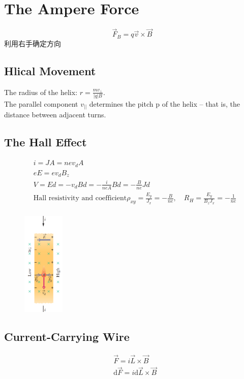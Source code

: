 \documentclass[11pt, a4paper]{article}
\begin{document}
\section{The Ampere Force}
$$\vec{F}_B = q\vec{v}\times \vec{B}$$
利用右手确定方向

\subsection{Hlical Movement}
The radius of the helix: $r=\frac{mv_\perp}{|q|B}$.\\
The parallel component $v_{||}$ determines the pitch p of the 
helix – that is, the distance between adjacent turns.

\subsection{The Hall Effect}
$$\begin{aligned} &i = JA =nev_dA\\
    &eE = ev_dB_z\\
    &V = Ed = -v_dBd = -\frac{i}{neA}Bd = -\frac{B}{ne}Jd\\
    &\text{Hall resistivity and coefficient} \rho_{xy}=\frac{E_y}{J_x}=-\frac B{ne},\quad R_H=\frac{E_y}{B_zJ_x}=-\frac1{ne}\\
\end{aligned}$$

\begin{figure}[htbp]
    \centering
    \includegraphics[height = 5cm]{Hall Effect.png}
\end{figure}

\subsection{Current-Carrying Wire}
$$\begin{aligned}
    &\vec{F} = i\vec{L} \times \vec{B}\\
    &\mathrm{d}\vec{F} = i \mathrm{d}\vec{L}\times \vec{B}\\
\end{aligned}$$
\end{document}
